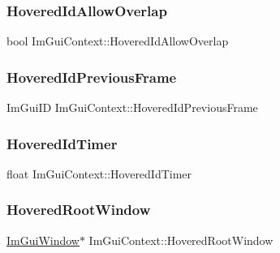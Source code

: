 \hypertarget{struct_im_gui_context_a171f67ac705994d413a0bccf491aa4e1}{}\label{struct_im_gui_context_a171f67ac705994d413a0bccf491aa4e1} 
\subsubsection{\texorpdfstring{Hovered\+Id\+Allow\+Overlap}{HoveredIdAllowOverlap}}
{\footnotesize\ttfamily bool Im\+Gui\+Context\+::\+Hovered\+Id\+Allow\+Overlap}

\hypertarget{struct_im_gui_context_a08742c14087e26304ff47fb9212d8eb6}{}\label{struct_im_gui_context_a08742c14087e26304ff47fb9212d8eb6} 
\subsubsection{\texorpdfstring{Hovered\+Id\+Previous\+Frame}{HoveredIdPreviousFrame}}
{\footnotesize\ttfamily Im\+Gui\+ID Im\+Gui\+Context\+::\+Hovered\+Id\+Previous\+Frame}

\hypertarget{struct_im_gui_context_a07a6bd929503077394ea0f80965470f9}{}\label{struct_im_gui_context_a07a6bd929503077394ea0f80965470f9} 
\subsubsection{\texorpdfstring{Hovered\+Id\+Timer}{HoveredIdTimer}}
{\footnotesize\ttfamily float Im\+Gui\+Context\+::\+Hovered\+Id\+Timer}

\hypertarget{struct_im_gui_context_ae5dcb8bed41ff948af2cfba6c9ae36d9}{}\label{struct_im_gui_context_ae5dcb8bed41ff948af2cfba6c9ae36d9} 
\subsubsection{\texorpdfstring{Hovered\+Root\+Window}{HoveredRootWindow}}
{\footnotesize\ttfamily \hyperlink{struct_im_gui_window}{Im\+Gui\+Window}$\ast$ Im\+Gui\+Context\+::\+Hovered\+Root\+Window}

